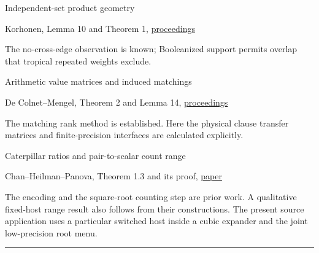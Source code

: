 \documentclass[11pt,a4paper]{article}
\newlength{\OfflineResearchTableWidth}
\newcommand{\OfflineResearchHeaderRule}{\noindent\rule{\linewidth}{0.45pt}\par}
\newcommand{\OfflineResearchRow}{\par}
\newenvironment{OfflineResearchTable}{%
  \par\medskip\begingroup\small\setlength{\parindent}{0pt}%
  \setlength{\parskip}{3pt plus 1pt minus .5pt}%
  \setlength{\OfflineResearchTableWidth}{\linewidth}%
}{%
  \par\endgroup\medskip%
}
\begin{document}
\begin{OfflineResearchTable}
\OfflineResearchRow
\noindent%
\begin{minipage}[t]{0.23625\OfflineResearchTableWidth}\raggedright
Independent-set product geometry
\end{minipage}\hfill%
\begin{minipage}[t]{0.34020\OfflineResearchTableWidth}\raggedright
Korhonen, Lemma 10 and Theorem 1,
\href{https://doi.org/10.4230/LIPIcs.ICALP.2021.87}{proceedings}
\end{minipage}\hfill%
\begin{minipage}[t]{0.36855\OfflineResearchTableWidth}\raggedright
The
no-cross-edge observation is known; Booleanized support permits overlap
that tropical repeated weights exclude.
\end{minipage}%
\OfflineResearchRow
\noindent%
\begin{minipage}[t]{0.23625\OfflineResearchTableWidth}\raggedright
Arithmetic value matrices and induced matchings
\end{minipage}\hfill%
\begin{minipage}[t]{0.34020\OfflineResearchTableWidth}\raggedright
De Colnet--Mengel,
Theorem 2 and Lemma 14,
\href{https://proceedings.kr.org/2021/20/kr2021-0020-de-colnet-et-al.pdf}{proceedings}
\end{minipage}\hfill%
\begin{minipage}[t]{0.36855\OfflineResearchTableWidth}\raggedright
The matching rank method is established. Here the physical clause
transfer matrices and finite-precision interfaces are calculated
explicitly.
\end{minipage}%
\OfflineResearchRow
\noindent%
\begin{minipage}[t]{0.23625\OfflineResearchTableWidth}\raggedright
Caterpillar ratios and pair-to-scalar count range
\end{minipage}\hfill%
\begin{minipage}[t]{0.34020\OfflineResearchTableWidth}\raggedright
Chan--Heilman--Panova, Theorem 1.3 and its proof,
\href{https://arxiv.org/html/2604.19094}{paper}
\end{minipage}\hfill%
\begin{minipage}[t]{0.36855\OfflineResearchTableWidth}\raggedright
The encoding and the
square-root counting step are prior work. A qualitative fixed-host range
result also follows from their constructions. The present source
application uses a particular switched host inside a cubic expander and
the joint low-precision root menu.
\end{minipage}%
\OfflineResearchRow
\OfflineResearchHeaderRule
\end{OfflineResearchTable}
\end{document}
